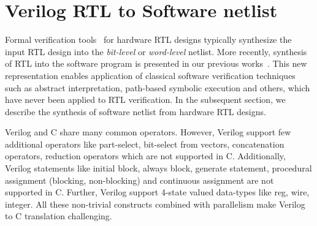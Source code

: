 \section{Verilog RTL to Software netlist}\label{sec:v2c}
%
Formal verification tools~\cite{abc,DBLP:conf/fmcad/BradleyM07,vis} for 
hardware RTL designs typically synthesize the input RTL design into the
\emph{bit-level} or \emph{word-level} netlist.  
%
%
More recently, synthesis of RTL into the software program is presented 
in our previous works~\cite{mkm2015,mtk2016}.  This new representation 
enables application of classical software verification techniques such as 
abstract interpretation, path-based symbolic execution and others, which 
have never been applied to RTL verification.  In the subsequent section, 
we describe the synthesis of software netlist from hardware RTL designs.     

Verilog and C share many common operators.  However, Verilog support few 
additional operators like part-select, bit-select from vectors, concatenation
operators, reduction operators which are not supported in C.  Additionally, Verilog 
statements like initial block, always block, generate statement, procedural assignment 
(blocking, non-blocking) and continuous assignment are 
not supported in C. Further, Verilog support 4-state valued data-types 
like reg, wire, integer.  All these non-trivial constructs combined with 
parallelism make Verilog to C translation challenging.

